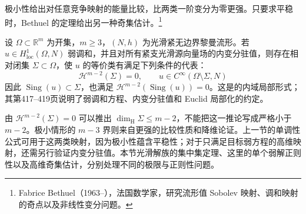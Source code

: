极小性给出对任意竞争映射的能量比较，比两类一阶变分为零更强。只要求平稳时，Bethuel 的定理给出另一种奇集估计。\footnote{Fabrice Bethuel（1963--），法国数学家，研究流形值 Sobolev 映射、调和映射的奇点以及非线性变分问题。}

\begin{theorem}[Bethuel]\label{g3:thm:stationary-map-partial-regularity}
	设 \(\Omega\subset\mathbb R^m\) 为开集，\(m\ge3\)，\((N,h)\) 为光滑紧无边界黎曼流形。若 \(u\in H^1_{\mathrm{loc}}(\Omega,N)\) 弱调和，并且对所有紧支光滑源向量场的内变分驻值，则存在相对闭集 \(\Sigma\subset\Omega\)，使 \(u\) 的等价类有满足下列条件的代表：
	\[
		\mathcal H^{m-2}(\Sigma)=0,
		\qquad u\in C^\infty(\Omega\setminus\Sigma,N)
	\]
	因此 \(\operatorname{Sing}(u)\subset\Sigma\)，也满足 \(\mathcal H^{m-2}(\operatorname{Sing}(u))=0\)。这是\cite[第418页，定理I.1]{Bethuel1993StationarySingularSet}的内域局部形式；其第417--419页说明了弱调和方程、内变分驻值和 Euclid 局部化的约定。
\end{theorem}

由 \(\mathcal H^{m-2}(\Sigma)=0\) 可以推出 \(\dim_{\mathrm H}\Sigma\le m-2\)，不能把这一推论写成严格小于 \(m-2\)。极小情形的 \(m-3\) 界则来自更强的比较性质和降维论证。上一节的单调性公式可用于这两类映射，因为极小性蕴含平稳性；对于只满足目标弱方程的高维映射，还需另行验证内变分驻值。本节光滑解族的集中集定理、这里的单个弱解正则性以及高维奇集估计，分别处理不同的极限与正则性问题。
